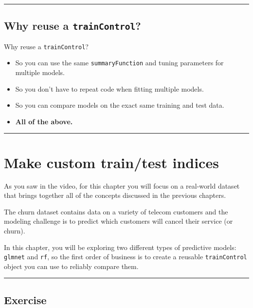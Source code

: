 \documentclass[]{book}
\begin{document}
\begin{center}\rule{0.5\linewidth}{\linethickness}\end{center}

\subsection*{\texorpdfstring{Why reuse a
\texttt{trainControl}?}{Why reuse a trainControl?}}\label{why-reuse-a-traincontrol}

Why reuse a \texttt{trainControl}?

\begin{itemize}
\item
  So you can use the same \texttt{summaryFunction} and tuning parameters
  for multiple models.
\item
  So you don't have to repeat code when fitting multiple models.
\item
  So you can compare models on the exact same training and test data.
\item
  \textbf{All of the above.}
\end{itemize}

\begin{center}\rule{0.5\linewidth}{\linethickness}\end{center}

\section{Make custom train/test
indices}\label{make-custom-traintest-indices}

As you saw in the video, for this chapter you will focus on a real-world
dataset that brings together all of the concepts discussed in the
previous chapters.

The churn dataset contains data on a variety of telecom customers and
the modeling challenge is to predict which customers will cancel their
service (or churn).

In this chapter, you will be exploring two different types of predictive
models: \texttt{glmnet} and \texttt{rf}, so the first order of business
is to create a reusable \texttt{trainControl} object you can use to
reliably compare them.

\begin{center}\rule{0.5\linewidth}{\linethickness}\end{center}

\subsection*{Exercise}\label{exercise-29}
\end{document}
